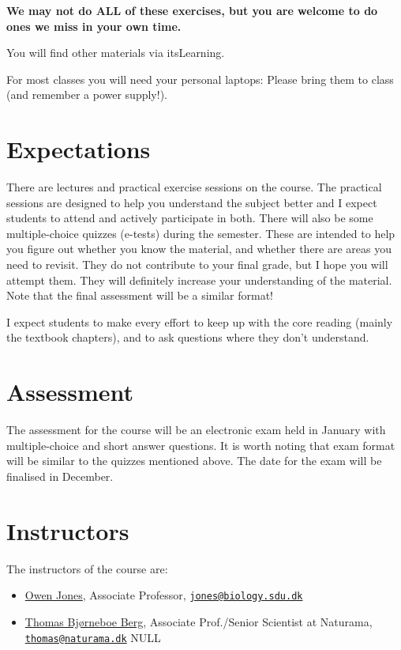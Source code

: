 \documentclass[
  a4paper]{book}
\providecommand{\tightlist}{%
  \setlength{\itemsep}{0pt}\setlength{\parskip}{0pt}}
\begin{document}
\textbf{We may not do ALL of these exercises, but you are welcome to do ones we miss in your own time.}

You will find other materials via itsLearning.

For most classes you will need your personal laptops: Please bring them to class (and remember a power supply!).

\section{Expectations}\label{expectations}

There are lectures and practical exercise sessions on the course. The practical sessions are designed to help you understand the subject better and I expect students to attend and actively participate in both. There will also be some multiple-choice quizzes (e-tests) during the semester. These are intended to help you figure out whether you know the material, and whether there are areas you need to revisit. They do not contribute to your final grade, but I hope you will attempt them. They will definitely increase your understanding of the material. Note that the final assessment will be a similar format!

I expect students to make every effort to keep up with the core reading (mainly the textbook chapters), and to ask questions where they don't understand.

\section{Assessment}\label{assessment}

The assessment for the course will be an electronic exam held in January with multiple-choice and short answer questions. It is worth noting that exam format will be similar to the quizzes mentioned above. The date for the exam will be finalised in December.

\section{Instructors}\label{instructors}

The instructors of the course are:

\begin{itemize}
\tightlist
\item
  \href{https://portal.findresearcher.sdu.dk/en/persons/jones}{Owen Jones}, Associate Professor, \href{mailto:jones@biology.sdu.dk}{\nolinkurl{jones@biology.sdu.dk}}
\item
  \href{https://portal.findresearcher.sdu.dk/en/persons/thomasbb}{Thomas Bjørneboe Berg}, Associate Prof./Senior Scientist at Naturama, \href{mailto:thomas@naturama.dk}{\nolinkurl{thomas@naturama.dk}}
  NULL
\end{itemize}
\end{document}
